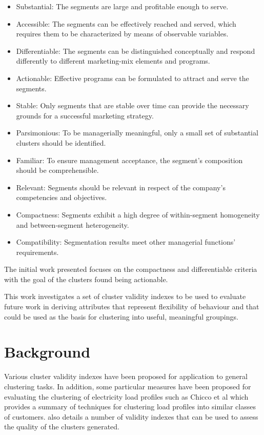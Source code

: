 \documentclass[conference]{IEEEtran}
\begin{document}
\begin{itemize}
\item Substantial: The segments are large and profitable enough to serve.
\item Accessible: The segments can be effectively reached and served, which requires
them to be characterized by means of observable variables.
\item Differentiable: The segments can be distinguished conceptually and respond
differently to different marketing-mix elements and programs.
\item Actionable: Effective programs can be formulated to attract and serve the
segments.
\item Stable: Only segments that are stable over time can provide the necessary
grounds for a successful marketing strategy.
\item Parsimonious: To be managerially meaningful, only a small set of substantial
clusters should be identified.
\item Familiar: To ensure management acceptance, the segment's composition should
be comprehensible.
\item Relevant: Segments should be relevant in respect of the company's competencies
and objectives.
\item Compactness: Segments exhibit a high degree of within-segment homogeneity
and between-segment heterogeneity.
\item Compatibility: Segmentation results meet other managerial functions' requirements.
\end{itemize}

The initial work presented focuses on the compactness and differentiable criteria with the goal of the clusters found being actionable.

This work investigates a set of cluster validity indexes to be used to evaluate future work in deriving attributes that represent flexibility of behaviour and that could be used as the basis for clustering into useful, meaningful groupings.

\section{Background}
Various cluster validity indexes have been proposed for application to general clustering tasks. In addition, some particular measures have been proposed for evaluating the clustering of electricity load profiles such as Chicco et al \cite{chicco2002review} which  provides a summary of techniques for clustering load profiles into similar classes of customers. \cite{chicco2002review} also details a number of validity indexes that can be used to assess the quality of the clusters generated. 
\end{document}
